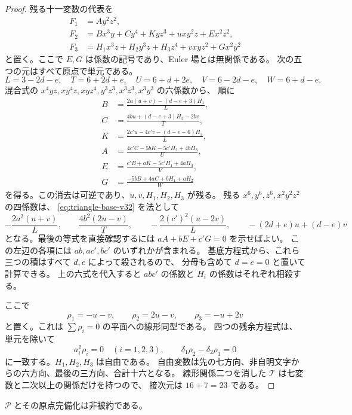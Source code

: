 \begin{proof}
残る十一変数の代表を
\begin{align*}
 F_1&=A y^2z^2,\\
 F_2&=B x^3y+C y^4+K yz^3+u xy^2z+E x^2z^2,\\
 F_3&=H_1x^3z+H_2y^3z+H_3z^4+v xyz^2+G x^2y^2
\end{align*}
と置く。ここで $E,G$ は係数の記号であり、Euler 場とは無関係である。
次の五つの元はすべて原点で単元である。
\[
 L=3-2d-e,\quad T=6+2d+e,\quad U=6+d+2e,
 \quad V=6-2d-e,\quad W=6+d-e.
\]
混合式の $x^4yz,xy^4z,xyz^4,y^3z^3,x^3z^3,x^3y^3$ の六係数から、
順に
\begin{align*}
 B&=\frac{2a(u+v)-(d-e+3)H_1}{L},\\
 C&=\frac{4bu+(d-e+3)H_2-2bv}{T},\\
 K&=\frac{2c'u-4c'v-(d-e-6)H_3}{L},\\
 A&=\frac{4c'C-5bK-5c'H_2+4bH_3}{U},\\
 E&=\frac{c'B+aK-5c'H_1+4aH_3}{V},\\
 G&=\frac{-5bB+4aC+bH_1+aH_2}{W}
\end{align*}
を得る。この消去は可逆であり、$u,v,H_1,H_2,H_3$ が残る。
残る $x^6,y^6,z^6,x^2y^2z^2$ の四係数は、
\eqref{eq:triangle-base-v32} を法として
\[
 -\frac{2a^2(u+v)}{L},\qquad
 \frac{4b^2(2u-v)}{T},\qquad
 -\frac{2(c')^2(u-2v)}{L},\qquad
 -(2d+e)u+(d-e)v
\]
となる。最後の等式を直接確認するには
$aA+bE+c'G=0$ を示せばよい。
この左辺の各項には $ab,ac',bc'$ のいずれかが含まれる。
基底方程式から、これら三つの積はすべて $d,e$ によって殺されるので、
分母も含めて $d=e=0$ と置いて計算できる。
上の六式を代入すると $abc'$ の係数と $H_i$ の係数はそれぞれ相殺する。

ここで
\[
 \rho_1=-u-v,\qquad\rho_2=2u-v,\qquad\rho_3=-u+2v
\]
と置く。これは $\sum\rho_i=0$ の平面への線形同型である。
四つの残余方程式は、単元を除いて
\[
 a_i^2\rho_i=0\quad(i=1,2,3),\qquad
 \delta_1\rho_2-\delta_2\rho_1=0
\]
に一致する。$H_1,H_2,H_3$ は自由である。
自由変数は先の七方向、非自明文字からの六方向、最後の三方向、合計十六となる。
線形関係二つを消した $\mathcal T$ は七変数と二次以上の関係だけを持つので、
接次元は $16+7=23$ である。
\end{proof}

\begin{corollary}
\label{cor:triangle-nonreduced-v32}
$\mathscr P$ とその原点完備化は非被約である。
\end{corollary}

